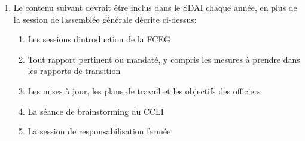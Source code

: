 \begin{enumerate}
 \item
  Le contenu suivant devrait être inclus dans le SDAI chaque année, en plus de la session de l\textquotesingle assemblée générale décrite ci-dessus:

  \begin{enumerate}
   \item
    Les sessions d\textquotesingle introduction de la FCEG
   \item
    Tout rapport pertinent ou mandaté, y compris les mesures à prendre dans les rapports de transition
   \item
    Les mises à jour, les plans de travail et les objectifs des officiers
   \item
    La séance de brainstorming du CCLI
   \item
    La session de responsabilisation fermée
  \end{enumerate}
\end{enumerate}

